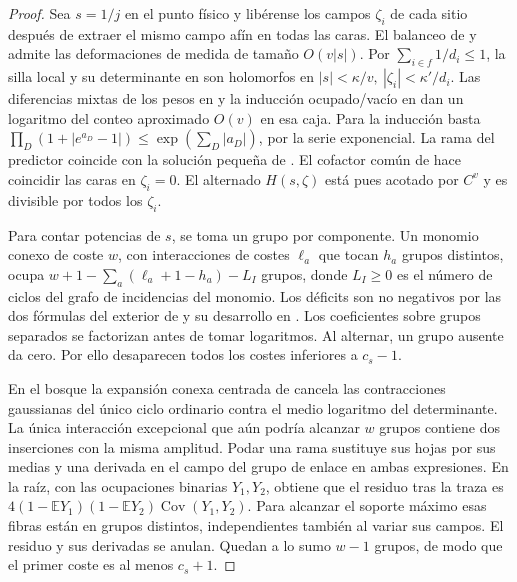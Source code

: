 \begin{proof}
Sea \(s=1/j\) en el punto físico y libérense los campos \(\zeta_i\) de cada sitio
después de extraer el mismo campo afín en todas las caras. El balanceo de  y
 admite las deformaciones de medida de tamaño \(O(v|s|)\).
Por \(\sum_{i\in f}1/d_i\le1\), la silla local y su determinante en 
son holomorfos en \(|s|<\kappa/v,\ |\zeta_i|<\kappa'/d_i\). Las diferencias mixtas
de los pesos en  y la inducción ocupado/vacío en  dan
un logaritmo del conteo aproximado \(O(v)\) en esa caja. Para la inducción basta
\(\prod_D(1+|e^{a_D}-1|)\le\exp(\sum_D|a_D|)\), por la serie exponencial.
La rama del predictor coincide con la solución pequeña de .
El cofactor común de  hace coincidir las caras en \(\zeta_i=0\).
El alternado \(H(s,\zeta)\) está pues acotado por \(C^v\) y es divisible por todos los
\(\zeta_i\).

Para contar potencias de \(s\), se toma un grupo por componente. Un monomio conexo de coste
\(w\), con interacciones de costes \(\ell_a\) que tocan \(h_a\) grupos distintos, ocupa
\(w+1-\sum_a(\ell_a+1-h_a)-L_I\) grupos, donde \(L_I\ge0\) es el número de ciclos del
grafo de incidencias del monomio. Los déficits son no negativos por las dos fórmulas del
exterior de  y su desarrollo en . Los coeficientes sobre grupos
separados se factorizan antes de tomar logaritmos. Al alternar, un grupo ausente da cero.
Por ello desaparecen todos los costes inferiores a \(c_s-1\).

En el bosque la expansión conexa centrada de  cancela las contracciones
gaussianas del único ciclo ordinario contra el medio logaritmo del determinante.
La única interacción excepcional que aún podría alcanzar \(w\) grupos contiene dos
inserciones con la misma amplitud. Podar una rama sustituye sus hojas por sus medias y
una derivada en el campo del grupo de enlace en ambas expresiones. En la raíz, con las
ocupaciones binarias \(Y_1,Y_2\),  obtiene que el residuo tras la traza es
\(4(1-\mathbb E Y_1)(1-\mathbb E Y_2)\operatorname{Cov}(Y_1,Y_2)\).
Para alcanzar el soporte máximo esas fibras están en grupos distintos, independientes
también al variar sus campos. El residuo y sus derivadas se anulan. Quedan a lo sumo
\(w-1\) grupos, de modo que el primer coste es al menos \(c_s+1\).


\end{proof}
